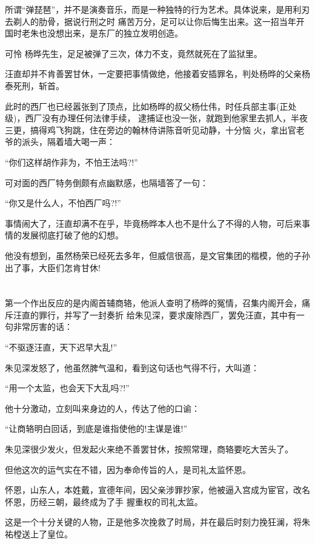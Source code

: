 \documentclass[11pt,a4paper,onecolumn]{article}
\begin{document}
所谓``弹琵琶''，并不是演奏音乐，而是一种独特的行为艺术。具体说来，是用利刃去剃人的肋骨，据说行刑之时
痛苦万分，足可以让你后悔生出来。这一招当年开国时老朱也没想出来，是东厂的独立发明创造。

可怜 杨晔先生，足足被弹了三次，体力不支，竟然就死在了监狱里。

汪直却并不肯善罢甘休，一定要把事情做绝，他接着安插罪名，判处杨晔的父亲杨泰死刑，斩首。

此时的西厂也已经嚣张到了顶点，比如杨晔的叔父杨仕伟，时任兵部主事(正处级)，西厂没有办理任何法律手续，
逮捕证也没一张，就跑到他家里去抓人，半夜三更，搞得鸡飞狗跳，住在旁边的翰林侍讲陈音听见动静，十分恼
火，拿出官老爷的派头，隔着墙大喝一声：

``你们这样胡作非为，不怕王法吗?!''

可对面的西厂特务倒颇有点幽默感，也隔墙答了一句：

``你又是什么人，不怕西厂吗?!''

事情闹大了，汪直却满不在乎，毕竟杨晔本人也不是什么了不得的人物，可后来事情的发展彻底打破了他的幻想。

他没有想到，虽然杨荣已经死去多年，但威信很高，是文官集团的楷模，他的子孙出了事，大臣们怎肯甘休!

\section[\thesection]{}

第一个作出反应的是内阁首辅商辂，他派人查明了杨晔的冤情，召集内阁开会，痛斥汪直的罪行，并写了一封奏折
给朱见深，要求废除西厂，罢免汪直，其中有一句非常厉害的话：

``不驱逐汪直，天下迟早大乱!''

朱见深发怒了，他虽然脾气温和，看到这句话也气得不行，大叫道：

``用一个太监，也会天下大乱吗?!''

他十分激动，立刻叫来身边的人，传达了他的口谕：

``让商辂明白回话，到底是谁指使他的!主谋是谁!''

朱见深很少发火，但发起火来绝不善罢甘休，按照常理，商辂要吃大苦头了。

但他这次的运气实在不错，因为奉命传旨的人，是司礼太监怀恩。

怀恩，山东人，本姓戴，宣德年间，因父亲涉罪抄家，他被逼入宫成为宦官，改名怀恩，历经三朝，最终成为了手
握重权的司礼太监。

这是一个十分关键的人物，正是他多次挽救了时局，并在最后时刻力挽狂澜，将朱祐樘送上了皇位。
\end{document}
